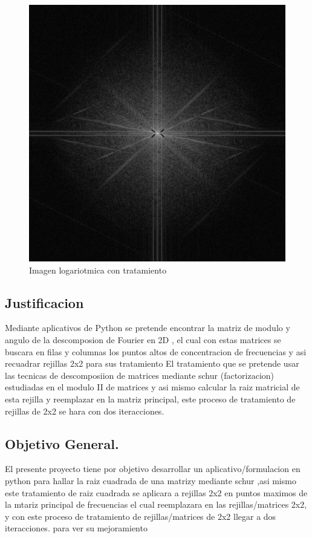 \documentclass[Spanish,12pt,doublespace,german,letterpaper]{article}
\begin{document}
\begin{figure}[h]
\begin{center}
\includegraphics[scale=0.4]{log_center_mag2.png}
\caption{Imagen logariotmica con tratamiento}
\label{Imagen logariotmica con tratamiento}
\end{center}
\end{figure}
\subsection{Justificacion}
Mediante aplicativos de Python se pretende   encontrar  la matriz de modulo y angulo de la descomposion de Fourier en 2D , el cual con estas matrices se buscara en filas y columnas los puntos altos de concentracion de frecuencias y asi recuadrar rejillas 2x2 para sus tratamiento  
El tratamiento que se pretende usar las tecnicas de descomposiion de matrices  mediante schur (factorizacion)  estudiadas en el modulo II de matrices y asi mismo calcular la raiz matricial de esta rejilla y reemplazar en la matriz principal, este proceso de tratamiento de rejillas de 2x2 se hara con dos iteracciones.
\subsection{Objetivo General.}
El presente proyecto  tiene por objetivo desarrollar un aplicativo/formulacion  en python para hallar la raiz cuadrada  de una matrizy mediante schur ,asi mismo este tratamiento de raiz cuadrada se aplicara  a rejillas 2x2 en puntos maximos de la mtariz principal de frecuencias  el cual reemplazara en las rejillas/matrices 2x2, y con  este proceso de tratamiento de rejillas/matrices de 2x2 llegar a  dos iteracciones. para ver su mejoramiento
\end{document}
